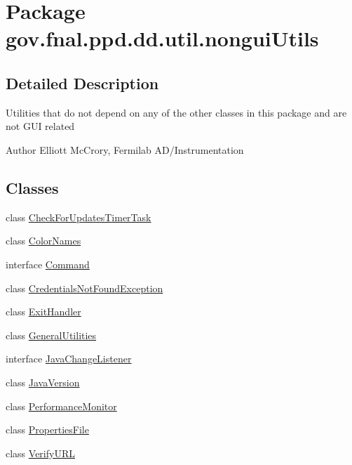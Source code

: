 \hypertarget{namespacegov_1_1fnal_1_1ppd_1_1dd_1_1util_1_1nonguiUtils}{\section{Package gov.\-fnal.\-ppd.\-dd.\-util.\-nongui\-Utils}
\label{namespacegov_1_1fnal_1_1ppd_1_1dd_1_1util_1_1nonguiUtils}
}


\subsection{Detailed Description}
Utilities that do not depend on any of the other classes in this package and are not G\-U\-I related

\begin{DoxyAuthor}{Author}
Elliott Mc\-Crory, Fermilab A\-D/\-Instrumentation 
\end{DoxyAuthor}
\subsection*{Classes}
\begin{DoxyCompactItemize}
\item 
class \hyperlink{classgov_1_1fnal_1_1ppd_1_1dd_1_1util_1_1nonguiUtils_1_1CheckForUpdatesTimerTask}{Check\-For\-Updates\-Timer\-Task}
\item 
class \hyperlink{classgov_1_1fnal_1_1ppd_1_1dd_1_1util_1_1nonguiUtils_1_1ColorNames}{Color\-Names}
\item 
interface \hyperlink{interfacegov_1_1fnal_1_1ppd_1_1dd_1_1util_1_1nonguiUtils_1_1Command}{Command}
\item 
class \hyperlink{classgov_1_1fnal_1_1ppd_1_1dd_1_1util_1_1nonguiUtils_1_1CredentialsNotFoundException}{Credentials\-Not\-Found\-Exception}
\item 
class \hyperlink{classgov_1_1fnal_1_1ppd_1_1dd_1_1util_1_1nonguiUtils_1_1ExitHandler}{Exit\-Handler}
\item 
class \hyperlink{classgov_1_1fnal_1_1ppd_1_1dd_1_1util_1_1nonguiUtils_1_1GeneralUtilities}{General\-Utilities}
\item 
interface \hyperlink{interfacegov_1_1fnal_1_1ppd_1_1dd_1_1util_1_1nonguiUtils_1_1JavaChangeListener}{Java\-Change\-Listener}
\item 
class \hyperlink{classgov_1_1fnal_1_1ppd_1_1dd_1_1util_1_1nonguiUtils_1_1JavaVersion}{Java\-Version}
\item 
class \hyperlink{classgov_1_1fnal_1_1ppd_1_1dd_1_1util_1_1nonguiUtils_1_1PerformanceMonitor}{Performance\-Monitor}
\item 
class \hyperlink{classgov_1_1fnal_1_1ppd_1_1dd_1_1util_1_1nonguiUtils_1_1PropertiesFile}{Properties\-File}
\item 
class \hyperlink{classgov_1_1fnal_1_1ppd_1_1dd_1_1util_1_1nonguiUtils_1_1VerifyURL}{Verify\-U\-R\-L}
\end{DoxyCompactItemize}
